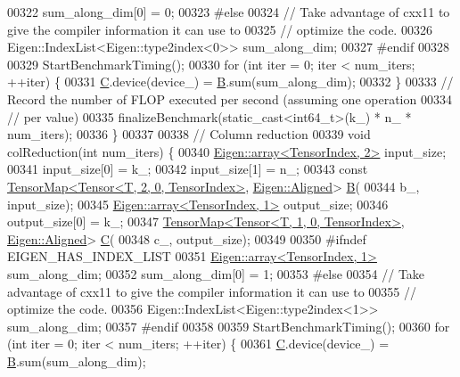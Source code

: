 \begin{DoxyCode}
00322     sum\_along\_dim[0] = 0;
00323 \textcolor{preprocessor}{#else}
00324     \textcolor{comment}{// Take advantage of cxx11 to give the compiler information it can use to}
00325     \textcolor{comment}{// optimize the code.}
00326     Eigen::IndexList<Eigen::type2index<0>> sum\_along\_dim;
00327 \textcolor{preprocessor}{#endif}
00328 
00329     StartBenchmarkTiming();
00330     \textcolor{keywordflow}{for} (\textcolor{keywordtype}{int} iter = 0; iter < num\_iters; ++iter) \{
00331       \hyperlink{group___core___module}{C}.device(device\_) = \hyperlink{group___core___module_class_eigen_1_1_matrix}{B}.sum(sum\_along\_dim);
00332     \}
00333     \textcolor{comment}{// Record the number of FLOP executed per second (assuming one operation}
00334     \textcolor{comment}{// per value)}
00335     finalizeBenchmark(static\_cast<int64\_t>(k\_) * n\_ * num\_iters);
00336   \}
00337 
00338   \textcolor{comment}{// Column reduction}
00339   \textcolor{keywordtype}{void} colReduction(\textcolor{keywordtype}{int} num\_iters) \{
00340     \hyperlink{class_eigen_1_1array}{Eigen::array<TensorIndex, 2>} input\_size;
00341     input\_size[0] = k\_;
00342     input\_size[1] = n\_;
00343     \textcolor{keyword}{const} \hyperlink{class_eigen_1_1_tensor_map}{TensorMap<Tensor<T, 2, 0, TensorIndex>}, 
      \hyperlink{group__enums_gga45fe06e29902b7a2773de05ba27b47a1ad37d4c71425bb286e9b4103830538fbf}{Eigen::Aligned}> \hyperlink{group___core___module_class_eigen_1_1_matrix}{B}(
00344         b\_, input\_size);
00345     \hyperlink{class_eigen_1_1array}{Eigen::array<TensorIndex, 1>} output\_size;
00346     output\_size[0] = k\_;
00347     \hyperlink{class_eigen_1_1_tensor_map}{TensorMap<Tensor<T, 1, 0, TensorIndex>}, 
      \hyperlink{group__enums_gga45fe06e29902b7a2773de05ba27b47a1ad37d4c71425bb286e9b4103830538fbf}{Eigen::Aligned}> \hyperlink{group___core___module}{C}(
00348         c\_, output\_size);
00349 
00350 \textcolor{preprocessor}{#ifndef EIGEN\_HAS\_INDEX\_LIST}
00351     \hyperlink{class_eigen_1_1array}{Eigen::array<TensorIndex, 1>} sum\_along\_dim;
00352     sum\_along\_dim[0] = 1;
00353 \textcolor{preprocessor}{#else}
00354     \textcolor{comment}{// Take advantage of cxx11 to give the compiler information it can use to}
00355     \textcolor{comment}{// optimize the code.}
00356     Eigen::IndexList<Eigen::type2index<1>> sum\_along\_dim;
00357 \textcolor{preprocessor}{#endif}
00358 
00359     StartBenchmarkTiming();
00360     \textcolor{keywordflow}{for} (\textcolor{keywordtype}{int} iter = 0; iter < num\_iters; ++iter) \{
00361       \hyperlink{group___core___module}{C}.device(device\_) = \hyperlink{group___core___module_class_eigen_1_1_matrix}{B}.sum(sum\_along\_dim);

\end{DoxyCode}
